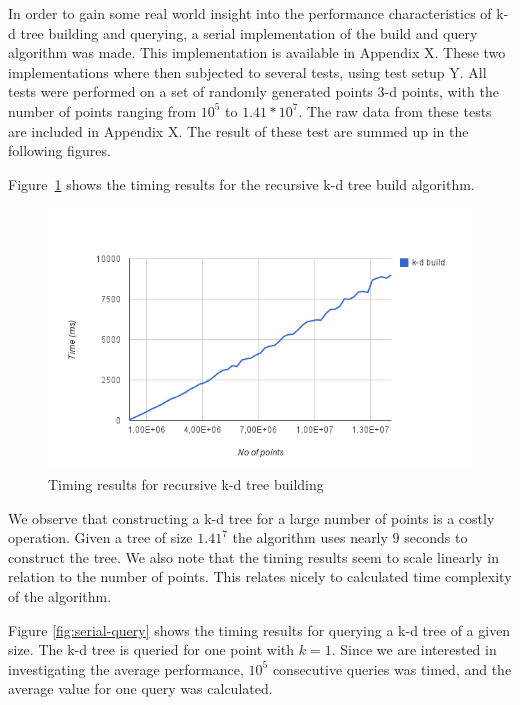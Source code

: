 In order to gain some real world insight into the performance characteristics of k-d tree building and querying, a serial implementation of the build and query algorithm was made. This implementation is available in Appendix X. These two implementations where then subjected to several tests, using test setup Y. All tests were performed on a set of randomly generated points 3-d points, with the number of points ranging from $10^5$ to $1.41*10^7$. The raw data from these tests are included in Appendix X. The result of these test are summed up in the following figures.

Figure~\ref{fig:serial-build} shows the timing results for the recursive k-d tree build algorithm.

\begin{figure}[ht!]
    \centering
    \includegraphics[width=120mm]{../gfx/serial-build.png}
    \caption{Timing results for recursive k-d tree building}
    \label{fig:serial-build}
\end{figure}

We observe that constructing a k-d tree for a large number of points is a costly operation. Given a tree of size $1.41^7$ the algorithm uses nearly $9$ seconds to construct the tree. We also note that the timing results seem to scale linearly in relation to the number of points. This relates nicely to calculated time complexity of the algorithm.

Figure \ref{fig:serial-query} shows the timing results for querying a k-d tree of a given size. The k-d tree is queried for one point with $k=1$. Since we are interested in investigating the average performance, $10^5$ consecutive queries was timed, and the average value for one query was calculated.

